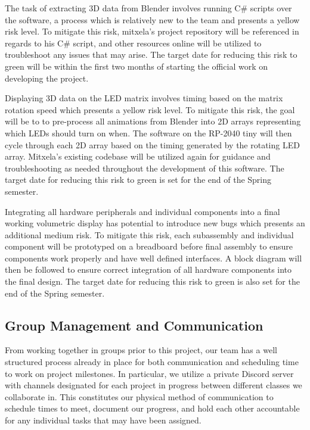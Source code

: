 \documentclass[11pt,journal]{IEEEtran}
\begin{document}
The task of extracting 3D data from Blender involves running C\# scripts over the software, a process which is relatively new to the team and presents a yellow risk level. To mitigate this risk, mitxela’s project repository will be referenced in regards to his C\# script, and other resources online will be utilized to troubleshoot any issues that may arise. The target date for reducing this risk to green will be within the first two months of starting the official work on developing the project.



Displaying 3D data on the LED matrix involves timing based on the matrix rotation speed which presents a yellow risk level. To mitigate this risk, the goal will be to to pre-process all animations from Blender into 2D arrays representing which LEDs should turn on when. The software on the RP-2040 tiny will then cycle through each 2D array based on the timing generated by the rotating LED array. Mitxela’s existing codebase will be utilized again for guidance and troubleshooting as needed throughout the development of this software. The target date for reducing this risk to green is set for the end of the Spring semester.

Integrating all hardware peripherals and individual components into a final working volumetric display has potential to introduce new bugs which presents an additional medium risk. To mitigate this risk, each subassembly and individual component will be prototyped on a breadboard before final assembly to ensure components work properly and have well defined interfaces. A block diagram will then be followed to ensure correct integration of all hardware components into the final design. The target date for reducing this risk to green is also set for the end of the Spring semester.

\subsection{Group Management and Communication}

From working together in groups prior to this project, our team has a well structured process already in place for both communication and scheduling time to work on project milestones. In particular, we utilize a private Discord server with channels designated for each project in progress between different classes we collaborate in. This constitutes our physical method of communication to schedule times to meet, document our progress, and hold each other accountable for any individual tasks that may have been assigned.
\end{document}
